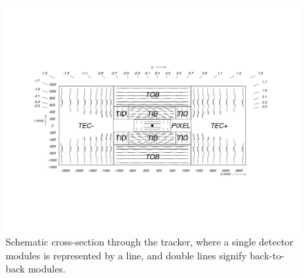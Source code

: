 \begin{figure}
  \begin{center}
    \includegraphics[width=\textwidth]{figs/tracker_schematic.pdf}
    \caption[Schematic cross-section through the \CMS tracker, where a single detector modules is represented by a line, and double lines signify back-to-back modules.]{Schematic cross-section through the \CMS tracker, where a single detector modules is represented by a line, and double lines signify back-to-back modules.}
    \label{fig:trackerxsec}
  \end{center}
\end{figure}


%

